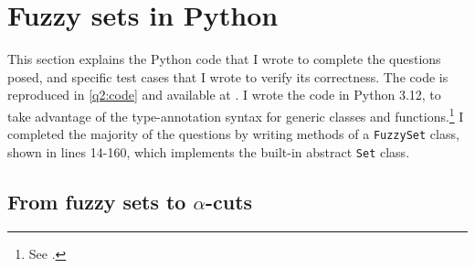 
\section{Fuzzy sets in Python}
\label{q2}

This section explains the Python code that I wrote to complete the questions posed, and
specific test cases that I wrote to verify its correctness.
The code is reproduced in \cref{q2:code} and available at
.
I wrote the code in Python 3.12, to take advantage of the type-annotation syntax for
generic classes and functions.\footnote{See
  .}
I completed the majority of the questions by writing methods of a \texttt{FuzzySet}
class, shown in lines 14-160, which implements the built-in abstract \texttt{Set}
class.

\subsection{From fuzzy sets to $\alpha$-cuts}
\label{q2:a}

